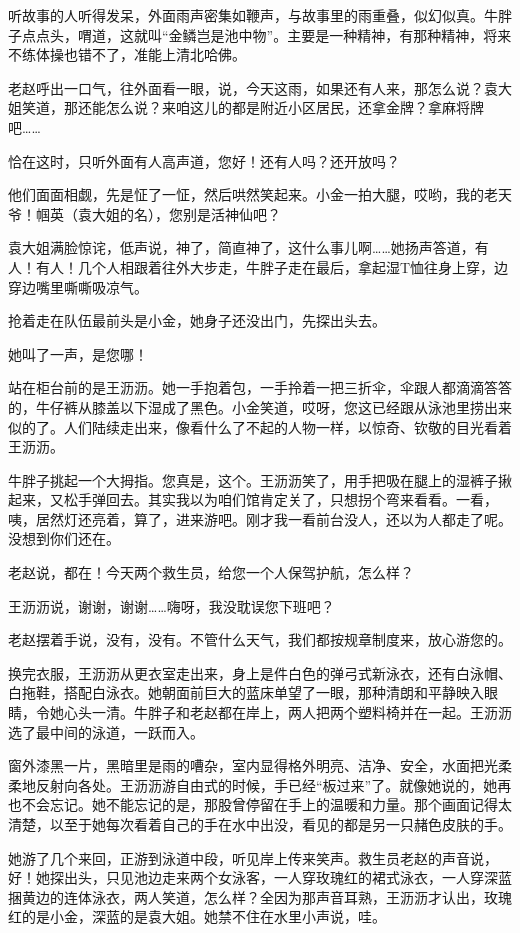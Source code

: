 \documentclass[lang=cn,newtx,12pt,scheme=chinese]{elegantbook}
\begin{document}
听故事的人听得发呆，外面雨声密集如鞭声，与故事里的雨重叠，似幻似真。牛胖子点点头，喟道，这就叫“金鳞岂是池中物”。主要是一种精神，有那种精神，将来不练体操也错不了，准能上清北哈佛。

老赵呼出一口气，往外面看一眼，说，今天这雨，如果还有人来，那怎么说？袁大姐笑道，那还能怎么说？来咱这儿的都是附近小区居民，还拿金牌？拿麻将牌吧……

恰在这时，只听外面有人高声道，您好！还有人吗？还开放吗？

他们面面相觑，先是怔了一怔，然后哄然笑起来。小金一拍大腿，哎哟，我的老天爷！帼英（袁大姐的名），您别是活神仙吧？

袁大姐满脸惊诧，低声说，神了，简直神了，这什么事儿啊……她扬声答道，有人！有人！几个人相跟着往外大步走，牛胖子走在最后，拿起湿T恤往身上穿，边穿边嘴里嘶嘶吸凉气。

抢着走在队伍最前头是小金，她身子还没出门，先探出头去。

她叫了一声，是您哪！

站在柜台前的是王沥沥。她一手抱着包，一手拎着一把三折伞，伞跟人都滴滴答答的，牛仔裤从膝盖以下湿成了黑色。小金笑道，哎呀，您这已经跟从泳池里捞出来似的了。人们陆续走出来，像看什么了不起的人物一样，以惊奇、钦敬的目光看着王沥沥。

牛胖子挑起一个大拇指。您真是，这个。王沥沥笑了，用手把吸在腿上的湿裤子揪起来，又松手弹回去。其实我以为咱们馆肯定关了，只想拐个弯来看看。一看，咦，居然灯还亮着，算了，进来游吧。刚才我一看前台没人，还以为人都走了呢。没想到你们还在。

老赵说，都在！今天两个救生员，给您一个人保驾护航，怎么样？

王沥沥说，谢谢，谢谢……嗨呀，我没耽误您下班吧？

老赵摆着手说，没有，没有。不管什么天气，我们都按规章制度来，放心游您的。

换完衣服，王沥沥从更衣室走出来，身上是件白色的弹弓式新泳衣，还有白泳帽、白拖鞋，搭配白泳衣。她朝面前巨大的蓝床单望了一眼，那种清朗和平静映入眼睛，令她心头一清。牛胖子和老赵都在岸上，两人把两个塑料椅并在一起。王沥沥选了最中间的泳道，一跃而入。

窗外漆黑一片，黑暗里是雨的嘈杂，室内显得格外明亮、洁净、安全，水面把光柔柔地反射向各处。王沥沥游自由式的时候，手已经“板过来”了。就像她说的，她再也不会忘记。她不能忘记的是，那股曾停留在手上的温暖和力量。那个画面记得太清楚，以至于她每次看着自己的手在水中出没，看见的都是另一只赭色皮肤的手。

她游了几个来回，正游到泳道中段，听见岸上传来笑声。救生员老赵的声音说，好！她探出头，只见池边走来两个女泳客，一人穿玫瑰红的裙式泳衣，一人穿深蓝捆黄边的连体泳衣，两人笑道，怎么样？全因为那声音耳熟，王沥沥才认出，玫瑰红的是小金，深蓝的是袁大姐。她禁不住在水里小声说，哇。
\end{document}
